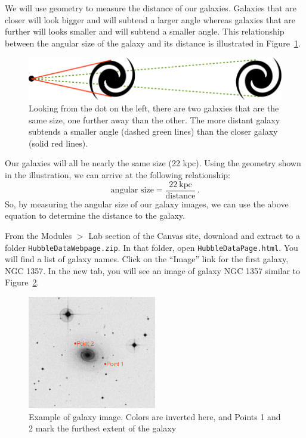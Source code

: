 We will use geometry to measure the distance of our galaxies. Galaxies
that are closer will look bigger and will subtend a larger angle whereas
galaxies that are further will looks smaller and will subtend a smaller
angle. This relationship between the angular size of the galaxy and its
distance is illustrated in Figure~\ref{hd:fig:galaxy-subtend}.

\begin{figure}
	\centering
	\includegraphics[width=\textwidth]{hubble-diagram/galaxy-subtend}
	\caption{Looking from the dot on the left, there are two galaxies that are the same size, one further away than the other. The more distant galaxy subtends a smaller angle (dashed green lines) than the closer galaxy (solid red lines).}\label{hd:fig:galaxy-subtend}
\end{figure}

Our galaxies will all be nearly the same size (22 kpc). Using the
geometry shown in the illustration, we can arrive at the following
relationship:
\begin{equation}\label{hd:eq:size}
 \textrm{angular size} = \frac{22\:\textrm{kpc}}{\textrm{distance}} \,.
\end{equation}
So, by measuring the angular size of our galaxy images, we can use the
above equation to determine the distance to the galaxy.

From the Modules $>$ Lab section of the Canvas site, download and extract to a folder \texttt{HubbleDataWebpage.zip}. In that folder, open \texttt{HubbleDataPage.html}. You
will find a list of galaxy names. Click on the ``Image'' link for the first
galaxy, NGC 1357. In the new tab, you will see an image of galaxy NGC
1357 similar to Figure~\ref{hd:fig:galaxy-example}.

\begin{figure}
	\centering
	\includegraphics[width=0.5\textwidth]{hubble-diagram/galaxy-example}
	\caption{Example of galaxy image. Colors are inverted here, and Points 1 and 2 mark the furthest extent of the galaxy}\label{hd:fig:galaxy-example}
\end{figure}

